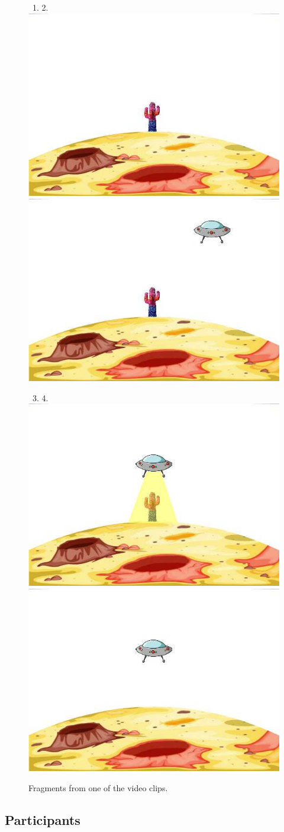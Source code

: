 \documentclass[output=paper]{langsci/langscibook}
\begin{document}
\begin{figure}
~\hfill 1. \hfill          2.\hfill~ \\
\includegraphics[width=.45\textwidth]{figures/levshina-img2.jpg}
\includegraphics[width=.45\textwidth]{figures/levshina-img3.jpg}
 

\noindent
~\hfill 3.      \hfill     4.\hfill~\\
\includegraphics[width=.45\textwidth]{figures/levshina-img4.jpg}
\includegraphics[width=.45\textwidth]{figures/levshina-img5.jpg}
 

\caption{Fragments from one of the video clips.} 
\label{fig:levshina:2}
\end{figure}

\subsection{Participants}
\end{document}
